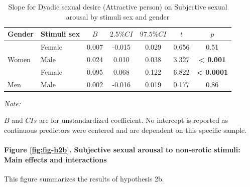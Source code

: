 \documentclass[
  bookmarksnumbered]{article}
\begin{document}
\begin{table}[H]

\caption{\label{tab:tab-m2b-slo-e}Slope for Dyadic sexual desire (Attractive person) on 
        Subjective sexual arousal by stimuli sex and gender}
\centering
\begin{threeparttable}
\begin{tabular}[t]{llccccc}
\toprule
Gender & Stimuli sex & $B$ & $2.5\% CI$ & $97.5\% CI$ & $t$ & $p$\\
\midrule
 & Female & 0.007 & -0.015 & 0.029 & 0.656 & 0.51\\
\cmidrule{2-7}
\multirow{-2}{*}{\raggedright\arraybackslash Women} & Male & 0.024 & 0.010 & 0.038 & 3.327 & \textbf{< 0.001}\\
\cmidrule{1-7}
 & Female & 0.095 & 0.068 & 0.122 & 6.822 & \textbf{< 0.0001}\\
\cmidrule{2-7}
\multirow{-2}{*}{\raggedright\arraybackslash Men} & Male & 0.002 & -0.016 & 0.019 & 0.177 & 0.86\\
\bottomrule
\end{tabular}
\begin{tablenotes}[para]
\item \textit{Note: } 
\item $B$ and $CIs$ are for unstandardized coefficient.
           No intercept is reported as continuous predictors were centered
           and are dependent on this specific sample.
\end{tablenotes}
\end{threeparttable}
\end{table}

\hypertarget{figure-reffigfig-h2b.-subjective-sexual-arousal-to-non-erotic-stimuli-main-effects-and-interactions}{%
\paragraph{Figure \ref{fig:fig-h2b}. Subjective sexual arousal to non-erotic stimuli: Main effects and interactions}\label{figure-reffigfig-h2b.-subjective-sexual-arousal-to-non-erotic-stimuli-main-effects-and-interactions}}

This figure summarizes the results of hypothesis 2b.
\end{document}
